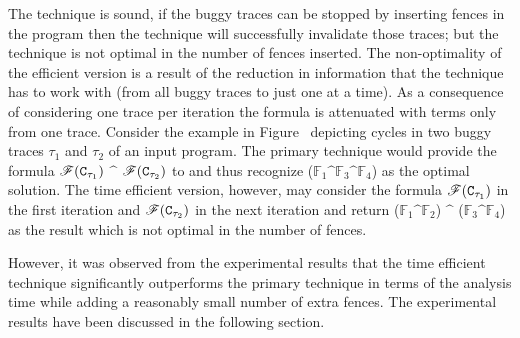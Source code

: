 The technique is sound, \ie if the buggy traces can be stopped by 
inserting \cc fences in the program then the technique will successfully
invalidate those traces;
but the technique is not optimal in the number of fences inserted.
The non-optimality of the efficient version is a result of the reduction
in information that the technique has to work with (from all buggy traces
to just one at a time). As a consequence of considering one trace per
iteration the \z formula is attenuated with terms only from one trace.
%
Consider the example in Figure~ 
depicting cycles in two buggy traces $\tau_1$ and $\tau_2$ of an 
input program. The primary \ourtechnique 
technique would provide the formula $\mathscr{F}({\tt C}_{\tau_1})$ $\^$ 
$\mathscr{F}({\tt C}_{\tau_2})$ to \z and thus recognize ($\mathbb{F}_1 \^ 
\mathbb{F}_3 \^ \mathbb{F}_4$) as the optimal solution.
The time efficient version, however, may consider the formula 
$\mathscr{F}({\tt C}_{\tau_1})$ in the first iteration and 
$\mathscr{F}({\tt C}_{\tau_2})$ in the next iteration and return
($\mathbb{F}_1 \^ \mathbb{F}_2$) $\^$ ($\mathbb{F}_3 \^ \mathbb{F}_4$) 
as the result which is not optimal in the number of fences.

However, it was observed from the experimental results that the time
efficient technique significantly outperforms the primary technique in terms of 
the analysis time while adding a reasonably small number of extra
fences. The experimental results have been discussed in the 
following section.